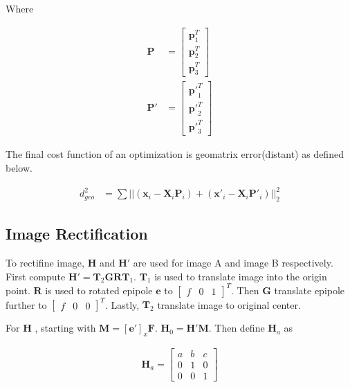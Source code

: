 \documentclass[11pt]{article}
\begin{document}
Where 

\begin{align*}
\mathbf{P} &= 
\begin{bmatrix} 
\mathbf{p}^T_1 \\
\mathbf{p}^T_2 \\
\mathbf{p}^T_3
\end{bmatrix} \\
\mathbf{P'} &= 
\begin{bmatrix} 
\mathbf{p'}^T_1 \\
\mathbf{p'}^T_2 \\
\mathbf{p'}^T_3
\end{bmatrix}
\end{align*}

The final cost function of an optimization is geomatrix error(distant) as defined below.

\begin{align*}
d^2_{geo} &= \sum ||(\mathbf{x}_i - \mathbf{X}_i  \mathbf{P}_i ) + (\mathbf{x'}_i - \mathbf{X}_i  \mathbf{P'}_i ) ||^2_2
\end{align*}


\subsection*{Image Rectification}

To rectifine image, $\mathbf{H}$ and $\mathbf{H'}$ are used for image A and image B respectively. First compute $\mathbf{H'} = \mathbf{T}_2\mathbf{G}\mathbf{R}\mathbf{T}_1$. $\mathbf{T}_1$ is used to translate image into the origin point. $\mathbf{R}$ is used to rotated epipole $\mathbf{e}$ to $\begin{bmatrix}f & 0 & 1\end{bmatrix}^T$. Then  $\mathbf{G}$ translate epipole further to $\begin{bmatrix}f & 0 & 0\end{bmatrix}^T$. Lastly, $\mathbf{T}_2$ translate image to original center.

For $\mathbf{H}$ , starting with $\mathbf{M} = [\mathbf{e'}]_x\mathbf{F}$. $\mathbf{H}_0 = \mathbf{H'}\mathbf{M}$. Then define $\mathbf{H}_a$ as 

\begin{align*}
\mathbf{H}_a = 
\begin{bmatrix} 
a & b & c  \\ 
0 & 1 & 0 \\ 
0 & 0 & 1
\end{bmatrix}
\end{align*}
\end{document}
